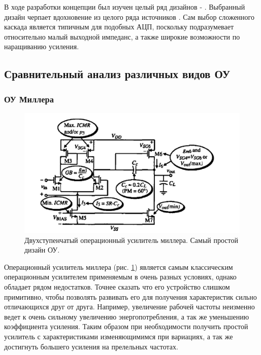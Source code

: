 \documentclass[a4paper,12pt]{article} %
\begin{document}
 В ходе разработки концепции был изучен целый ряд дизайнов \cite{op_amp_comp1} - \cite{op_amp_comp5}. Выбранный  дизайн черпает вдохновение из целого ряда источников . Сам выбор сложенного каскада является типичным для подобных АЦП, поскольку подразумевает относительно малый выходной импеданс, а также широкие возможности по наращиванию усиления.  

\subsection{Сравнительный анализ различных видов ОУ}


\subsubsection{ОУ Миллера}


\begin{figure}[]
    \includegraphics[width=\textwidth]{m_op_amp.png}
    \caption{Двухступенчатый операционный усилитель миллера. Самый простой дизайн ОУ.}
    \label{pic:m_op_amp}
\end{figure}



Операционный усилитель миллера (рис. \ref{pic:m_op_amp}) является самым классическим операционным усилителем применяемым в очень разных условиях, однако обладает рядом недостатков. Точнее сказать что его устройство слишком примитивно, чтобы позволять развивать его для получения характеристик сильно отличающихся друг от друга. Например, увеличение рабочей частоты неизменно ведет к очень сильному увеличению энергопотребления, а так же уменьшению коэффициента усиления. Таким образом при необходимости получить простой усилитель с характеристиками изменяющимимся при вариациях, а так же достигнуть большего усиления на прелельных частотах.
\end{document}
